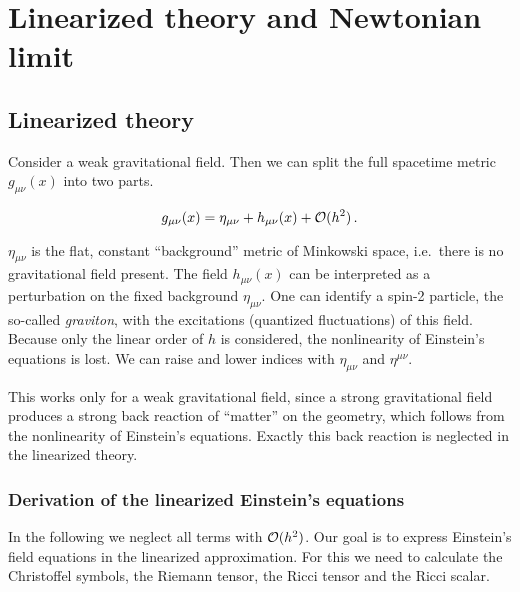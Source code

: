 \chapter{Linearized theory and Newtonian limit}
\section{Linearized theory}
Consider a weak gravitational field. Then we can split the full spacetime metric $g_{\mu\nu}(x)$ into two parts.
\begin{definition}
    \begin{equation}
        g_{\mu\nu}(x) = \eta_{\mu\nu} + h_{\mu\nu}(x) + \mathcal{O}(h^2) \, .
    \end{equation}
\end{definition}
$\eta_{\mu\nu}$ is the flat, constant ``background'' metric of Minkowski space, i.e.\ there is no gravitational field present.
The field $h_{\mu\nu}(x)$ can be interpreted as a perturbation on the fixed background $\eta_{\mu\nu}$.
One can identify a spin-2 particle, the so-called \emph{graviton}, with the excitations (quantized fluctuations) of this field.
Because only the linear order of $h$ is considered, the nonlinearity of Einstein's equations is lost.
We can raise and lower indices with $\eta_{\mu\nu}$ and $\eta^{\mu\nu}$.

\begin{remark}
This works only for a weak gravitational field, since a strong gravitational field produces a strong back reaction of ``matter''
on the geometry, which follows from the nonlinearity of Einstein's equations.
Exactly this back reaction is neglected in the linearized theory.
\end{remark}

\subsection{Derivation of the linearized Einstein's equations}
In the following we neglect all terms with $\mathcal{O}(h^2)$.
Our goal is to express Einstein's field equations in the linearized approximation.
For this we need to calculate the Christoffel symbols, the Riemann tensor, the Ricci tensor and the Ricci scalar.

